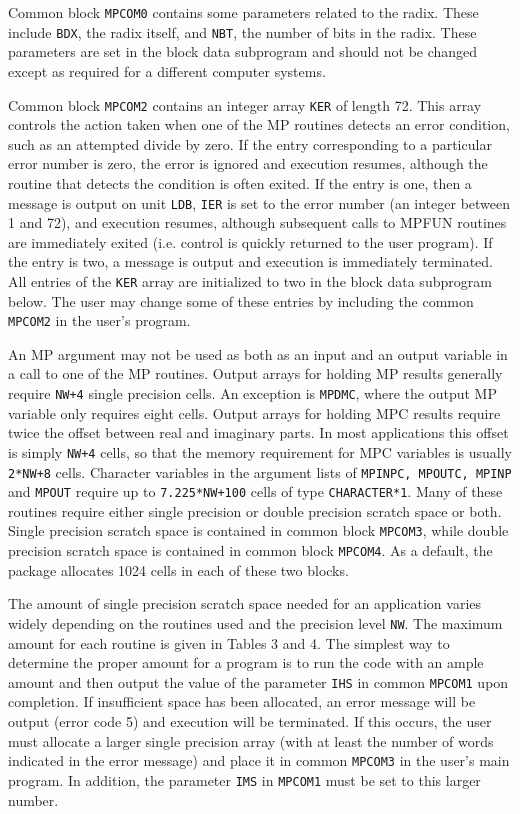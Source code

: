 Common block {\tt MPCOM0} contains some parameters related to the
radix.  These include {\tt BDX}, the radix itself, and {\tt NBT}, the
number of bits in the radix.  These parameters are set in the block
data subprogram and should not be changed except as required for a
different computer systems.

Common block {\tt MPCOM2} contains an integer array {\tt KER} of
length 72.  This array controls the action taken when one of the MP
routines detects an error condition, such as an attempted divide by
zero.  If the entry corresponding to a particular error number is
zero, the error is ignored and execution resumes, although the routine
that detects the condition is often exited.  If the entry is one, then
a message is output on unit {\tt LDB}, {\tt IER} is set to the error
number (an integer between 1 and 72), and execution resumes, although
subsequent calls to MPFUN routines are immediately exited (i.e.
control is quickly returned to the user program).  If the entry is
two, a message is output and execution is immediately terminated.  All
entries of the {\tt KER} array are initialized to two in the block
data subprogram below.  The user may change some of these entries by
including the common {\tt MPCOM2} in the user's program.

An MP argument may not be used as both as an input and an output
variable in a call to one of the MP routines.  Output arrays for
holding MP results generally require {\tt NW+4} single precision
cells.  An exception is {\tt MPDMC}, where the output MP variable only
requires eight cells.  Output arrays for holding MPC results require
twice the offset between real and imaginary parts.  In most
applications this offset is simply {\tt NW+4} cells, so that the
memory requirement for MPC variables is usually {\tt2*NW+8} cells.
Character variables in the argument lists of {\tt MPINPC, MPOUTC,
MPINP} and {\tt MPOUT} require up to {\tt 7.225*NW+100} cells of type
{\tt CHARACTER*1}.  Many of these routines require either single
precision or double precision scratch space or both.  Single precision
scratch space is contained in common block {\tt MPCOM3}, while double
precision scratch space is contained in common block {\tt MPCOM4}.  As
a default, the package allocates 1024 cells in each of these two
blocks.

The amount of single precision scratch space needed for an application
varies widely depending on the routines used and the precision level
{\tt NW}.  The maximum amount for each routine is given in Tables 3
and 4.  The simplest way to determine the proper amount for a program
is to run the code with an ample amount and then output the value of
the parameter {\tt IHS} in common {\tt MPCOM1} upon completion.  If
insufficient space has been allocated, an error message will be output
(error code 5) and execution will be terminated.  If this occurs, the
user must allocate a larger single precision array (with at least the
number of words indicated in the error message) and place it in common
{\tt MPCOM3} in the user's main program.  In addition, the parameter
{\tt IMS} in {\tt MPCOM1} must be set to this larger number.

